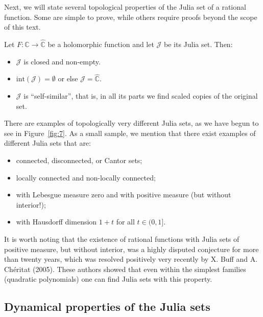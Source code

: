 \documentclass[12pt, a4paper]{article}
\begin{document}
Next, we will state several topological properties of the Julia set of a
rational function. Some are simple to prove, while others require proofs beyond
the scope of this text.

\begin{proposition}
Let $F:\hat{\mathbb{C}}\rightarrow\hat{\mathbb{C}}$ be a holomorphic function
and let $\mathcal{J}$ be its Julia set. Then:
\begin{itemize}
    \item $\mathcal{J}$ is closed and non-empty.
    \item $\text{int}(\mathcal{J})=\emptyset$ or else
    $\mathcal{J}=\hat{\mathbb{C}}$.
    \item $\mathcal{J}$ is ``self-similar'', that is, in all its parts we find
    scaled copies of the original set.
\end{itemize}
\end{proposition}

There are examples of topologically very different Julia sets, as we have begun
to see in Figure~\ref{fig:7}. As a small sample, we mention that there exist
examples of different Julia sets that are:
\begin{itemize}
    \item connected, disconnected, or Cantor sets;
    \item locally connected and non-locally connected;
    \item with Lebesgue measure zero and with positive measure (but without
    interior!);
    \item with Hausdorff dimension $1+t$ for all $t\in(0,1]$.
\end{itemize}

It is worth noting that the existence of rational functions with Julia sets of
positive measure, but without interior, was a highly disputed conjecture for
more than twenty years, which was resolved positively very recently by X. Buff
and A. Chéritat (2005). These authors showed that even within the simplest
families (quadratic polynomials) one can find Julia sets with this property.

\subsection{Dynamical properties of the Julia sets}
\end{document}
